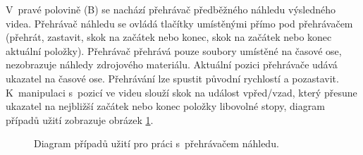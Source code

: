 V~pravé polovině (B) se nachází přehrávač předběžného náhledu výsledného videa. Přehrávač náhledu se ovládá tlačítky umístěnými přímo pod přehrávačem (přehrát, zastavit, skok na začátek nebo konec, skok na začátek nebo konec aktuální položky). Přehrávač přehrává pouze soubory umístěné na časové ose, nezobrazuje náhledy zdrojového materiálu. Aktuální pozici přehrávače udává ukazatel na časové ose. Přehrávání lze spustit původní rychlostí a pozastavit. K~manipulaci s~pozicí ve videu slouží skok na událost vpřed/vzad, který přesune ukazatel na nejbližší začátek nebo konec položky libovolné stopy, diagram případů užití zobrazuje obrázek \ref{img:ucd-prehravac}.
\begin{figure}[!h]
	\centering
	\caption{Diagram případů užití pro práci s~přehrávačem náhledu.}\label{img:ucd-prehravac}
\end{figure}

